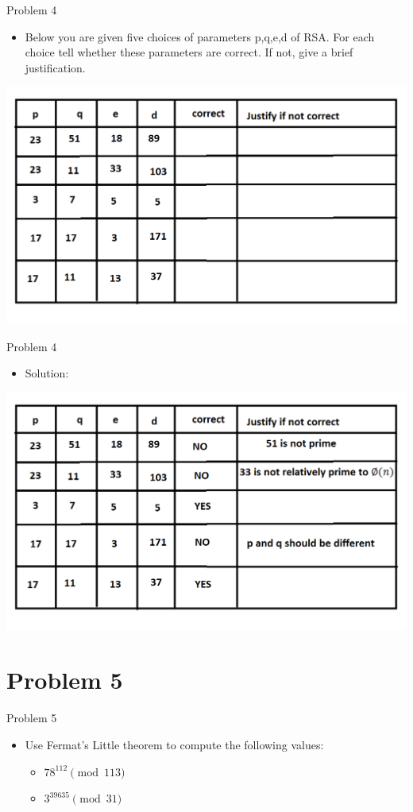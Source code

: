 \documentclass{beamer}
\begin{document}
\begin{frame}{Problem 4}
    \begin{itemize}
        \item Below you are given five choices of parameters p,q,e,d of RSA. For each choice tell whether these parameters are correct. If not, give a brief justification.
    \end{itemize}
    \centering \includegraphics[width=.7\linewidth]{p4.png} 
\end{frame}

\begin{frame}{Problem 4}
    \begin{itemize}
        \item Solution:
    \end{itemize}
    \centering \includegraphics[width=.8\linewidth]{p3.png} 
\end{frame}

\section{Problem 5}

\begin{frame}{Problem 5}
    \begin{itemize} 
        \item Use Fermat's Little theorem to compute the following values:
        \begin{itemize}
            \item $78^{112} \pmod{113}$
            \item $3^{39635} \pmod{31}$
        \end{itemize}
    \end{itemize}
\end{frame}
\end{document}
